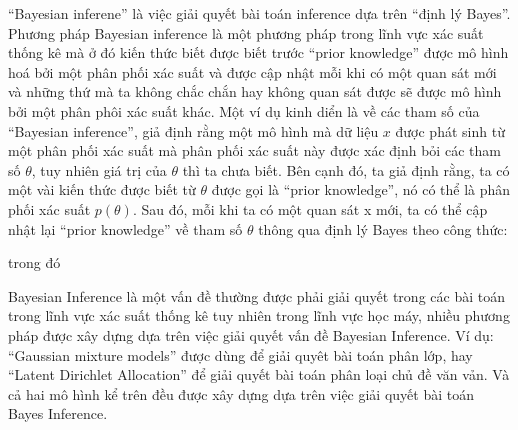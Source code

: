         ``Bayesian inferene'' là việc giải quyết bài toán inference dựa trên ``định lý Bayes''. Phương pháp Bayesian inference là một phương pháp trong lĩnh vực xác suất thống kê mà ở đó kiến thức biết được biết trước ``prior knowledge'' được mô hình hoá bởi một phân phối xác suất và được cập nhật mỗi khi có một quan sát mới và những thứ mà ta không chắc chắn hay không quan sát được sẽ được mô hình bởi một phân phôi xác suất khác. Một ví dụ kinh diển là về các tham số của ``Bayesian inference'', giả định rằng một mô hình mà dữ liệu $x$ được phát sinh từ một phân phối xác suất mà phân phối xác suất này được xác định bỏi các tham số $\theta$, tuy nhiên giá trị của $\theta$ thì ta chưa biết. Bên cạnh đó, ta giả định rằng, ta có một vài kiến thức được biết từ $\theta$ được gọi là ``prior knowledge'', nó có thể là phân phối xác suất $p(\theta)$. Sau đó, mỗi khi ta có một quan sát x mới, ta có thể cập nhật lại ``prior knowledge'' về tham số $\theta$ thông qua định lý Bayes theo công thức:

        trong đó 

        
        Bayesian Inference là một vấn đề thường được phải giải quyết trong các bài toán trong lĩnh vực xác suất thống kê tuy nhiên trong lĩnh vực học máy, nhiều phương pháp được xây dựng dựa trên việc giải quyết vấn đề Bayesian Inference. Ví dụ: ``Gaussian mixture models'' được dùng để giải quyêt bài toán phân lớp, hay ``Latent Dirichlet Allocation'' để giải quyết bài toán phân loại chủ đề văn vản. Và cả hai mô hình kể trên đều được xây dựng dựa trên việc giải quyết bài toán Bayes Inference.  



